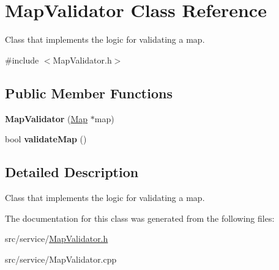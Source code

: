 \hypertarget{classMapValidator}{}\section{Map\+Validator Class Reference}
\label{classMapValidator}


Class that implements the logic for validating a map.  




{\ttfamily \#include $<$Map\+Validator.\+h$>$}

\subsection*{Public Member Functions}
\begin{DoxyCompactItemize}
\item 
\hypertarget{classMapValidator_a45fa5f33235b3e6de7666b6a5348c3a6}{}\label{classMapValidator_a45fa5f33235b3e6de7666b6a5348c3a6} 
{\bfseries Map\+Validator} (\hyperlink{classMap}{Map} $\ast$map)
\item 
\hypertarget{classMapValidator_a2066350c56590df7d109587034515f84}{}\label{classMapValidator_a2066350c56590df7d109587034515f84} 
bool {\bfseries validate\+Map} ()
\end{DoxyCompactItemize}


\subsection{Detailed Description}
Class that implements the logic for validating a map. 

The documentation for this class was generated from the following files\+:\begin{DoxyCompactItemize}
\item 
src/service/\hyperlink{MapValidator_8h}{Map\+Validator.\+h}\item 
src/service/Map\+Validator.\+cpp\end{DoxyCompactItemize}
